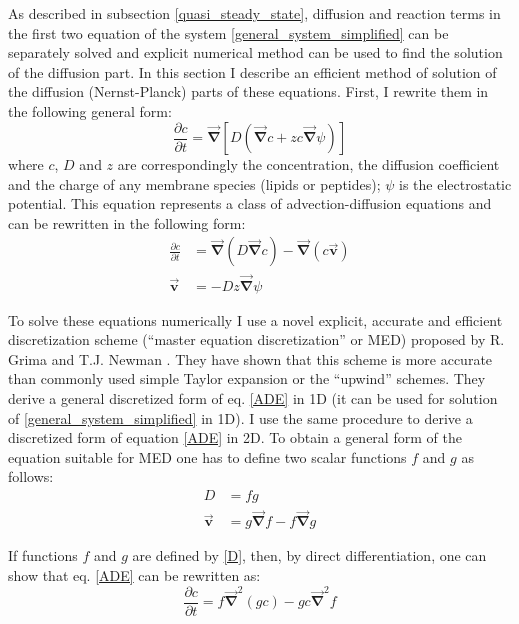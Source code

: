 As described in subsection \ref{quasi_steady_state}, diffusion and reaction terms in the first two equation of the system \eqref{general_system_simplified} can be separately solved and explicit numerical method can be used to find the solution of the diffusion part. In this section I describe an efficient method of solution of the diffusion (Nernst-Planck) parts of these equations. First, I rewrite them in the following general form:
\begin{equation}
\frac{\partial c}{\partial t}=\vec{\mathbf{\nabla}}[D(\vec{\mathbf{\nabla}} c+z c\vec{\mathbf{\nabla}} \psi)]
\end{equation}
where $c$, $D$ and $z$ are correspondingly the concentration, the diffusion coefficient and the charge of any membrane species (lipids or peptides); $\psi$ is the electrostatic potential. This equation represents a class of advection-diffusion equations and can be rewritten in the following form:
\begin{align}
\label{ADE}
\frac{\partial c}{\partial t}&=\vec{\mathbf{\nabla}} (D\vec{\mathbf{\nabla}} c)-\vec{\mathbf{\nabla}} (c \vec{\mathbf{v}}) \nonumber \\
 \vec{\mathbf{v}} &= - D z \vec{\mathbf{\nabla}} \psi
\end{align}

To solve these equations numerically I use a novel explicit, accurate and efficient discretization scheme (``master equation discretization'' or MED) proposed by R. Grima and T.J. Newman \cite{Grima2004}. They have shown that this scheme is more accurate than commonly used simple Taylor expansion or the ``upwind'' schemes. They derive a general discretized form of eq. \eqref{ADE} in 1D (it can be used for solution of \eqref{general_system_simplified} in 1D). I use the same procedure to derive a discretized form of equation \eqref{ADE} in 2D. To obtain a general form of the equation suitable for MED one has to define two scalar functions $f$ and $g$ as follows:
\begin{align}
\label{D}
D &= f g \nonumber \\
\vec{\mathbf{v}} &= g \vec{\mathbf{\nabla}} f - f \vec{\mathbf{\nabla}} g
\end{align}

If functions \(f\) and \(g\) are defined by \eqref{D}, then, by direct differentiation, one can show that eq. \eqref{ADE} can be rewritten as:
\begin{equation}
\label{suitable_MED}
\frac{\partial c}{\partial t} = f \vec{\mathbf{\nabla}}^2(g c) - gc \vec{\mathbf{\nabla}}^2 f
\end{equation}

